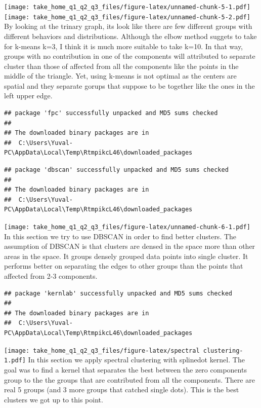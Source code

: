 \documentclass[
]{article}
\begin{document}
\texttt{[image: take\_home\_q1\_q2\_q3\_files/figure-latex/unnamed-chunk-5-1.pdf]}
\texttt{[image: take\_home\_q1\_q2\_q3\_files/figure-latex/unnamed-chunk-5-2.pdf]}
By looking at the trinary graph, its look like there are few different
groups with different behaviors and distributions. Although the elbow
method suggets to take for k-means k=3, I think it is much more suitable
to take k=10. In that way, groups with no contribution in one of the
components will attributed to separate cluster than those of affected
from all the components like the points in the middle of the triangle.
Yet, using k-means is not optimal as the centers are spatial and they
separate gorups that suppose to be together like the ones in the left
upper edge.

\begin{verbatim}
## package 'fpc' successfully unpacked and MD5 sums checked
## 
## The downloaded binary packages are in
##  C:\Users\Yuval-PC\AppData\Local\Temp\RtmpikcL46\downloaded_packages
\end{verbatim}

\begin{verbatim}
## package 'dbscan' successfully unpacked and MD5 sums checked
## 
## The downloaded binary packages are in
##  C:\Users\Yuval-PC\AppData\Local\Temp\RtmpikcL46\downloaded_packages
\end{verbatim}

\texttt{[image: take\_home\_q1\_q2\_q3\_files/figure-latex/unnamed-chunk-6-1.pdf]}
In this section we try to use DBSCAN in order to find better clusters.
The assumption of DBSCAN is that clusters are densed in the space more
than other areas in the space. It groups densely grouped data points
into single cluster. It performs better on separating the edges to other
groups than the points that affected from 2-3 components.

\begin{verbatim}
## package 'kernlab' successfully unpacked and MD5 sums checked
## 
## The downloaded binary packages are in
##  C:\Users\Yuval-PC\AppData\Local\Temp\RtmpikcL46\downloaded_packages
\end{verbatim}

\texttt{[image: take\_home\_q1\_q2\_q3\_files/figure-latex/spectral clustering-1.pdf]}
In this section we apply spectral clustering with splinedot kernel. The
goal was to find a kernel that separates the best between the zero
components group to the the groups that are contributed from all the
components. There are real 5 groups (and 3 more groups that catched
single dots). This is the best clusters we got up to this point.
\end{document}
